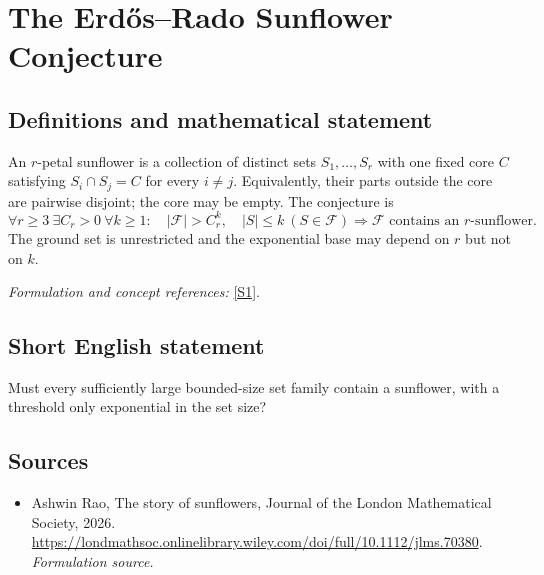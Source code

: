 \documentclass[11pt]{article}
\begin{document}
\section*{\texorpdfstring{The Erdős–Rado Sunflower Conjecture}{The Erdős–Rado Sunflower Conjecture}}\label{30004916}
\subsection{Definitions and mathematical statement}
An $r$-petal sunflower is a collection of distinct sets $S_1,\ldots,S_r$ with one fixed core $C$ satisfying $S_i\cap S_j=C$ for every $i\ne j$. Equivalently, their parts outside the core are pairwise disjoint; the core may be empty. The conjecture is
\[
 \forall r\ge3\ \exists C_r>0\ \forall k\ge1:\quad
 |\mathcal F|>C_r^k,\quad|S|\le k\ (S\in\mathcal F)
 \Rightarrow\mathcal F\text{ contains an }r\text{-sunflower}.
\]
The ground set is unrestricted and the exponential base may depend on $r$ but not on $k$.
\par\smallskip\textit{Formulation and concept references:} \href{https://londmathsoc.onlinelibrary.wiley.com/doi/full/10.1112/jlms.70380}{[S1]}.

\subsection{Short English statement}
Must every sufficiently large bounded-size set family contain a sunflower, with a threshold only exponential in the set size?
\subsection{Sources}
\begin{itemize}
\item[S1]Ashwin Rao, The story of sunflowers, Journal of the London Mathematical Society, 2026.
\url{https://londmathsoc.onlinelibrary.wiley.com/doi/full/10.1112/jlms.70380}.
\textit{Formulation source.}
\end{itemize}
\end{document}
